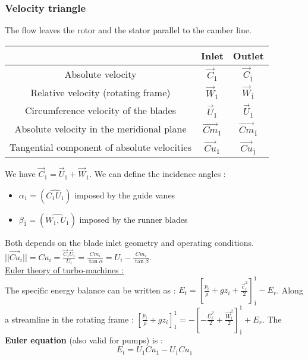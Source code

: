 \documentclass[../main.tex]{subfiles}
\begin{document}
\subsubsection{Velocity triangle}
\warning The flow leaves the rotor and the stator parallel to the camber line.\\
\begin{table}[hbt!]
    \centering
    \begin{tabular}{c||c|c}
        & Inlet & Outlet \\ \hline \hline
        Absolute velocity & $\Vec{C}_1$ & $\Vec{C}_{\overline{1}}$\\ \hline
        Relative velocity (rotating frame) & $\Vec{W}_1$ & $\Vec{W}_{\overline{1}}$\\ \hline
        Circumference velocity of the blades & $\Vec{U}_1$ & $\Vec{U}_{\overline{1}}$ \\\hline
        Absolute velocity in the meridional plane & $\Vec{Cm}_1$ & $\Vec{Cm}_{\overline{1}}$\\ \hline
        Tangential component of absolute velocities & $\Vec{Cu}_1$ & $\Vec{Cu}_{\overline{1}}$\\
    \end{tabular}
\end{table}
We have $\vec{C}_1 = \vec{U}_1 + \vec{W}_1$. We can define the incidence angles : \begin{itemize}
    \item $\alpha_1 = (\widehat{C_1 U_1})$ imposed by the guide vanes
    \item $\beta_{\overline{1}} = (\hat{W_{\overline{1}}, U_{\overline{1}}})$ imposed by the runner blades
\end{itemize}
Both depends on the blade inlet geometry and operating conditions. \\

$\lvert \lvert \vec{Cu}_i \rvert \rvert = Cu_i = \frac{\vec{C}_i \vec{U}_i}{U_i} = \frac{Cm_i}{\tan \alpha} = U_i - \frac{Cm_i}{\tan \beta}$.\\

\quad \underline{Euler theory of turbo-machines :}\\
The specific energy balance can be written as : $E_t = [\frac{p_i}{\rho} + gz_i + \frac{\vec{c}_i^2}{2}]_{\overline{1}}^1 - E_r$. Along a streamline in the rotating frame : $[\frac{p_i}{\rho} + gz_i]_{\overline{1}}^1 = - [-\frac{\overline{U}_i^2}{2} + \frac{\vec{W}_i^2}{2}]_{\overline{1}}^1 + E_r$. The \textbf{Euler equation} (also valid for pumps) is : \begin{equation}
    E_t = U_1 Cu_1 - U_{\overline{1}} Cu_{\overline{1}}
\end{equation}
\end{document}
